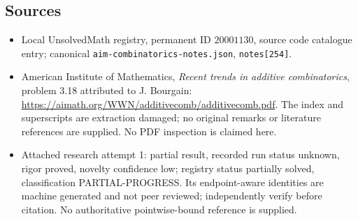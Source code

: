 \documentclass[11pt]{article}
\begin{document}
\subsection{Sources}
\begin{itemize}
\item Local UnsolvedMath registry, permanent ID $20001130$, source code catalogue entry; canonical \texttt{aim-combinatorics-notes.json}, \texttt{notes[254]}.
\item American Institute of Mathematics, \emph{Recent trends in additive combinatorics}, problem 3.18 attributed to J. Bourgain: \url{https://aimath.org/WWN/additivecomb/additivecomb.pdf}. The index and superscripts are extraction damaged; no original remarks or literature references are supplied. No PDF inspection is claimed here.
\item Attached research attempt 1: partial result, recorded run status unknown, rigor proved, novelty confidence low; registry status partially solved, classification PARTIAL-PROGRESS. Its endpoint-aware identities are machine generated and not peer reviewed; independently verify before citation. No authoritative pointwise-bound reference is supplied.
\end{itemize}
\end{document}

